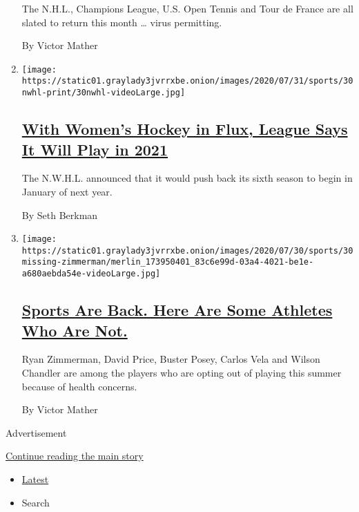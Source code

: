 \begin{enumerate}
  The N.H.L., Champions League, U.S. Open Tennis and Tour de France are
  all slated to return this month \ldots{} virus permitting.

  By Victor Mather
\item
  \texttt{[image: https://static01.graylady3jvrrxbe.onion/images/2020/07/31/sports/30nwhl-print/30nwhl-videoLarge.jpg]}

  \hypertarget{with-womens-hockey-in-flux-league-says-it-will-play-in-2021}{%
  \subsection{\texorpdfstring{\href{/2020/07/30/sports/hockey/nwhl-postpone-season.html}{With
  Women's Hockey in Flux, League Says It Will Play in
  2021}}{With Women's Hockey in Flux, League Says It Will Play in 2021}}\label{with-womens-hockey-in-flux-league-says-it-will-play-in-2021}}

  The N.W.H.L. announced that it would push back its sixth season to
  begin in January of next year.

  By Seth Berkman
\item
  \texttt{[image: https://static01.graylady3jvrrxbe.onion/images/2020/07/30/sports/30missing-zimmerman/merlin\_173950401\_83c6e99d-03a4-4021-be1e-a680aebda54e-videoLarge.jpg]}

  \hypertarget{sports-are-back-here-are-some-athletes-who-are-not}{%
  \subsection{\texorpdfstring{\href{/2020/07/30/sports/players-opt-out.html}{Sports
  Are Back. Here Are Some Athletes Who Are
  Not.}}{Sports Are Back. Here Are Some Athletes Who Are Not.}}\label{sports-are-back-here-are-some-athletes-who-are-not}}

  Ryan Zimmerman, David Price, Buster Posey, Carlos Vela and Wilson
  Chandler are among the players who are opting out of playing this
  summer because of health concerns.

  By Victor Mather
\end{enumerate}

Advertisement

\protect\hyperlink{after-mid1}{Continue reading the main story}

\begin{itemize}
\tightlist
\item
  \protect\hyperlink{stream-panel}{Latest}
\item
  Search
\end{itemize}

